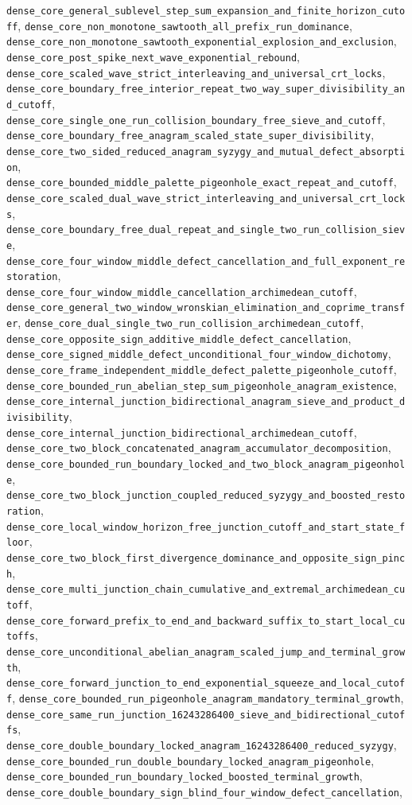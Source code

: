 \documentclass[11pt]{article}
\begin{document}
\begin{enumerate}
\texttt{dense\_core\_general\_sublevel\_step\_sum\_expansion\_and\_finite\_horizon\_cutoff}, \texttt{dense\_core\_non\_monotone\_sawtooth\_all\_prefix\_run\_dominance}, \texttt{dense\_core\_non\_monotone\_sawtooth\_exponential\_explosion\_and\_exclusion}, \texttt{dense\_core\_post\_spike\_next\_wave\_exponential\_rebound}, \texttt{dense\_core\_scaled\_wave\_strict\_interleaving\_and\_universal\_crt\_locks}, \texttt{dense\_core\_boundary\_free\_interior\_repeat\_two\_way\_super\_divisibility\_and\_cutoff}, \texttt{dense\_core\_single\_one\_run\_collision\_boundary\_free\_sieve\_and\_cutoff}, \texttt{dense\_core\_boundary\_free\_anagram\_scaled\_state\_super\_divisibility}, \texttt{dense\_core\_two\_sided\_reduced\_anagram\_syzygy\_and\_mutual\_defect\_absorption}, \texttt{dense\_core\_bounded\_middle\_palette\_pigeonhole\_exact\_repeat\_and\_cutoff}, \texttt{dense\_core\_scaled\_dual\_wave\_strict\_interleaving\_and\_universal\_crt\_locks}, \texttt{dense\_core\_boundary\_free\_dual\_repeat\_and\_single\_two\_run\_collision\_sieve}, \texttt{dense\_core\_four\_window\_middle\_defect\_cancellation\_and\_full\_exponent\_restoration}, \texttt{dense\_core\_four\_window\_middle\_cancellation\_archimedean\_cutoff}, \texttt{dense\_core\_general\_two\_window\_wronskian\_elimination\_and\_coprime\_transfer}, \texttt{dense\_core\_dual\_single\_two\_run\_collision\_archimedean\_cutoff}, \texttt{dense\_core\_opposite\_sign\_additive\_middle\_defect\_cancellation}, \texttt{dense\_core\_signed\_middle\_defect\_unconditional\_four\_window\_dichotomy}, \texttt{dense\_core\_frame\_independent\_middle\_defect\_palette\_pigeonhole\_cutoff}, \texttt{dense\_core\_bounded\_run\_abelian\_step\_sum\_pigeonhole\_anagram\_existence}, \texttt{dense\_core\_internal\_junction\_bidirectional\_anagram\_sieve\_and\_product\_divisibility}, \texttt{dense\_core\_internal\_junction\_bidirectional\_archimedean\_cutoff}, \texttt{dense\_core\_two\_block\_concatenated\_anagram\_accumulator\_decomposition}, \texttt{dense\_core\_bounded\_run\_boundary\_locked\_and\_two\_block\_anagram\_pigeonhole}, \texttt{dense\_core\_two\_block\_junction\_coupled\_reduced\_syzygy\_and\_boosted\_restoration}, \texttt{dense\_core\_local\_window\_horizon\_free\_junction\_cutoff\_and\_start\_state\_floor}, \texttt{dense\_core\_two\_block\_first\_divergence\_dominance\_and\_opposite\_sign\_pinch}, \texttt{dense\_core\_multi\_junction\_chain\_cumulative\_and\_extremal\_archimedean\_cutoff}, \texttt{dense\_core\_forward\_prefix\_to\_end\_and\_backward\_suffix\_to\_start\_local\_cutoffs}, \texttt{dense\_core\_unconditional\_abelian\_anagram\_scaled\_jump\_and\_terminal\_growth}, \texttt{dense\_core\_forward\_junction\_to\_end\_exponential\_squeeze\_and\_local\_cutoff}, \texttt{dense\_core\_bounded\_run\_pigeonhole\_anagram\_mandatory\_terminal\_growth}, \texttt{dense\_core\_same\_run\_junction\_16243286400\_sieve\_and\_bidirectional\_cutoffs}, \texttt{dense\_core\_double\_boundary\_locked\_anagram\_16243286400\_reduced\_syzygy}, \texttt{dense\_core\_bounded\_run\_double\_boundary\_locked\_anagram\_pigeonhole}, \texttt{dense\_core\_bounded\_run\_boundary\_locked\_boosted\_terminal\_growth}, \texttt{dense\_core\_double\_boundary\_sign\_blind\_four\_window\_defect\_cancellation}, 
\end{enumerate}
\end{document}
